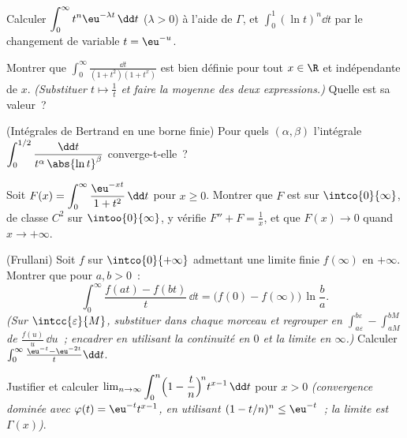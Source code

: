 \begin{exercise}[$\star$]\label{exo:b2:integration:2}
Calculer $\displaystyle\int_0^\infty t^n \eu^{-\lambda t}\,\dd t$
($\lambda > 0$) à l'aide de $\Gamma$, et
$\displaystyle\int_0^1 (\ln t)^n \dd t$ par le changement de variable $t =
\eu^{-u}$.
\end{exercise}

\begin{exercise}[$\star$]\label{exo:b2:integration:3}
Montrer que $\displaystyle\int_0^{\infty} \frac{\dd t}{(1 +
t^2)(1 + t^x)}$ est bien définie pour tout $x \in \R$ et
indépendante de $x$. \emph{(Substituer $t \mapsto \frac1t$ et
faire la moyenne des deux expressions.)} Quelle est sa valeur~?
\end{exercise}

\begin{exercise}[$\star\star$]\label{exo:b2:integration:4}
(Intégrales de Bertrand en une borne finie) Pour quels $(\alpha,
\beta)$ l'intégrale $\displaystyle\int_0^{1/2}
\frac{\dd t}{t^\alpha\,\abs{\ln t}^\beta}$ converge-t-elle~?
\end{exercise}

\begin{exercise}[$\star\star$]\label{exo:b2:integration:5}
Soit $F(x) = \displaystyle\int_0^{\infty} \frac{\eu^{-xt}}{1 +
t^2}\,\dd t$ pour $x \geq 0$. Montrer que $F$ est  sur
$\intco{0}{\infty}$, de classe $C^2$ sur $\intoo{0}{\infty}$, y vérifie $F'' +
F = \frac1x$, et que $F(x) \to 0$ quand $x \to +\infty$.
\end{exercise}

\begin{exercise}[$\star\star$]\label{exo:b2:integration:6}
(Frullani) Soit $f$  sur $\intco{0}{+\infty}$ admettant une
limite finie $f(\infty)$ en $+\infty$. Montrer que pour $a, b > 0$~:
\[
\int_0^{\infty} \frac{f(at) - f(bt)}{t}\,\dd t
= \bigl(f(0) - f(\infty)\bigr)\,\ln\frac ba .
\]
\emph{(Sur $\intcc{\varepsilon}{M}$, substituer dans chaque morceau et
regrouper en $\int_{a\varepsilon}^{b\varepsilon} -
\int_{aM}^{bM}$ de $\frac{f(u)}u\,\dd u$~; encadrer en utilisant la
continuité en $0$ et la limite en $\infty$.)} Calculer
$\int_0^\infty \frac{\eu^{-t} - \eu^{-2t}}{t}\dd t$.
\end{exercise}

\begin{exercise}[$\star\star$]\label{exo:b2:integration:7}
Justifier et calculer $\lim_{n\to\infty} \displaystyle\int_0^n
\Bigl(1 - \frac tn\Bigr)^{\!n} t^{x-1}\,\dd t$ pour $x > 0$
\emph{(convergence dominée avec $\varphi(t) = \eu^{-t}t^{x-1}$,
en utilisant $(1 - t/n)^n \leq \eu^{-t}$~; la limite est $\Gamma(x)$)}.
\end{exercise}

